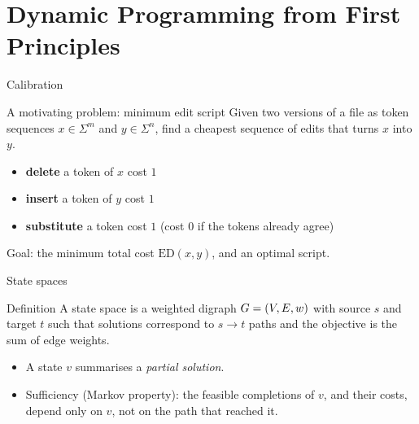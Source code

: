 \section{Dynamic Programming from First Principles}

\begin{frame}{Calibration}
\end{frame}

\begin{frame}{A motivating problem: minimum edit script}
	Given two versions of a file as token sequences $x \in \Sigma^m$ and $y \in \Sigma^n$,
	find a cheapest sequence of edits that turns $x$ into $y$.

	\begin{itemize}
		\item \textbf{delete} a token of $x$ \hfill cost $1$
		\item \textbf{insert} a token of $y$ \hfill cost $1$
		\item \textbf{substitute} a token \hfill cost $1$ (cost $0$ if the tokens already agree)
	\end{itemize}

	\seprule

	Goal: the minimum total cost $\mathrm{ED}(x,y)$, and an optimal script.
\end{frame}

\begin{frame}{State spaces}
	\begin{block}{Definition}
		A \alert{state space} is a weighted digraph $G=(V,E,w)$ with source $s$ and target $t$ such that
		solutions correspond to $s\to t$ paths and the objective is the sum of edge weights.
	\end{block}

	\begin{itemize}
		\item A state $v$ summarises a \emph{partial solution}.
		\item \alert{Sufficiency (Markov property):} the feasible completions of $v$, and
		their costs, depend only on $v$, not on the path that reached it.
	\end{itemize}
\end{frame}

